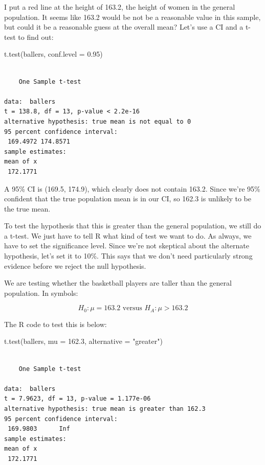 \documentclass[
  letterpaper,
  DIV=11,
  numbers=noendperiod,
  oneside]{scrreprt}
\newenvironment{Shaded}{\begin{snugshade}}{\end{snugshade}}
\newcommand{\AttributeTok}[1]{\textcolor[rgb]{0.40,0.45,0.13}{#1}}
\newcommand{\FloatTok}[1]{\textcolor[rgb]{0.68,0.00,0.00}{#1}}
\newcommand{\FunctionTok}[1]{\textcolor[rgb]{0.28,0.35,0.67}{#1}}
\newcommand{\NormalTok}[1]{\textcolor[rgb]{0.00,0.23,0.31}{#1}}
\newcommand{\StringTok}[1]{\textcolor[rgb]{0.13,0.47,0.30}{#1}}
\begin{document}
I put a red line at the height of 163.2, the height of women in the
general population. It seems like 163.2 would be not be a reasonable
value in this sample, but could it be a reasonable guess at the overall
mean? Let's use a CI and a t-test to find out:

\begin{Shaded}
\begin{Highlighting}[]
\FunctionTok{t.test}\NormalTok{(ballers, }\AttributeTok{conf.level =} \FloatTok{0.95}\NormalTok{)}
\end{Highlighting}
\end{Shaded}

\begin{verbatim}

    One Sample t-test

data:  ballers
t = 138.8, df = 13, p-value < 2.2e-16
alternative hypothesis: true mean is not equal to 0
95 percent confidence interval:
 169.4972 174.8571
sample estimates:
mean of x 
 172.1771 
\end{verbatim}

A 95\% CI is (169.5, 174.9), which clearly does not contain 163.2. Since
we're 95\% confident that the true population mean is in our CI, so
162.3 is unlikely to be the true mean.

To test the hypothesis that this is greater than the general population,
we still do a t-test. We just have to tell R what kind of test we want
to do. As always, we have to set the significance level. Since we're not
skeptical about the alternate hypothesis, let's set it to 10\%. This
says that we don't need particularly strong evidence before we reject
the null hypothesis.

We are testing whether the basketball players are taller than the
general population. In symbols:

\[
H_0: \mu = 163.2 \text{ versus } H_A: \mu > 163.2
\]

The R code to test this is below:

\begin{Shaded}
\begin{Highlighting}[]
\FunctionTok{t.test}\NormalTok{(ballers, }\AttributeTok{mu =} \FloatTok{162.3}\NormalTok{, }\AttributeTok{alternative =} \StringTok{"greater"}\NormalTok{)}
\end{Highlighting}
\end{Shaded}

\begin{verbatim}

    One Sample t-test

data:  ballers
t = 7.9623, df = 13, p-value = 1.177e-06
alternative hypothesis: true mean is greater than 162.3
95 percent confidence interval:
 169.9803      Inf
sample estimates:
mean of x 
 172.1771 
\end{verbatim}
\end{document}
